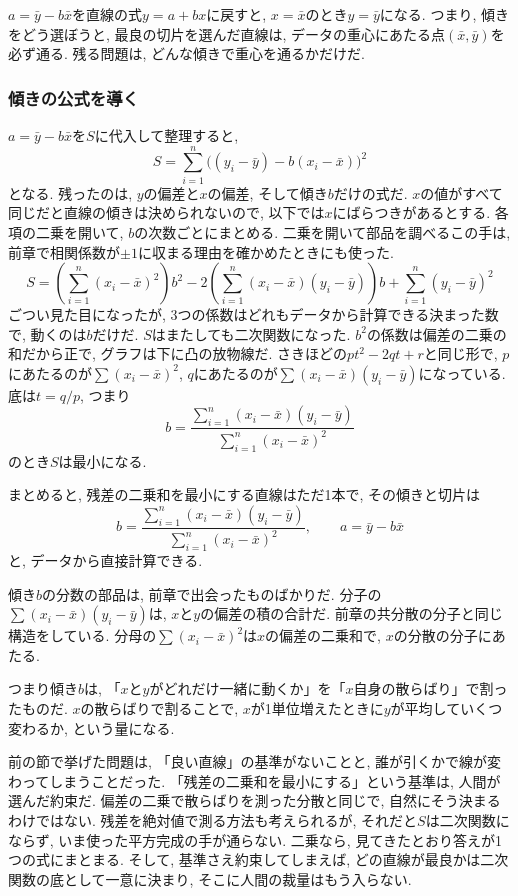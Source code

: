 $a = \bar{y} - b\bar{x}$を直線の式$y = a + bx$に戻すと, $x = \bar{x}$のとき$y = \bar{y}$になる.
つまり, 傾きをどう選ぼうと, 最良の切片を選んだ直線は, データの重心にあたる点$(\bar{x}, \bar{y})$を必ず通る.
残る問題は, どんな傾きで重心を通るかだけだ.

\subsubsection*{傾きの公式を導く}

$a = \bar{y} - b\bar{x}$を$S$に代入して整理すると,
\[
  S = \sum_{i=1}^{n} \bigl( (y_i - \bar{y}) - b(x_i - \bar{x}) \bigr)^2
\]
となる.
残ったのは, $y$の偏差と$x$の偏差, そして傾き$b$だけの式だ. $x$の値がすべて同じだと直線の傾きは決められないので, 以下では$x$にばらつきがあるとする.
各項の二乗を開いて, $b$の次数ごとにまとめる.
二乗を開いて部品を調べるこの手は, 前章で相関係数が$\pm 1$に収まる理由を確かめたときにも使った.
\[
  S = \left( \sum_{i=1}^{n}(x_i - \bar{x})^2 \right) b^2
      - 2\left( \sum_{i=1}^{n}(x_i - \bar{x})(y_i - \bar{y}) \right) b
      + \sum_{i=1}^{n}(y_i - \bar{y})^2
\]
ごつい見た目になったが, 3つの係数はどれもデータから計算できる決まった数で, 動くのは$b$だけだ.
$S$はまたしても二次関数になった.
$b^2$の係数は偏差の二乗の和だから正で, グラフは下に凸の放物線だ.
さきほどの$pt^2 - 2qt + r$と同じ形で, $p$にあたるのが$\sum(x_i - \bar{x})^2$, $q$にあたるのが$\sum(x_i - \bar{x})(y_i - \bar{y})$になっている.
底は$t = q/p$, つまり
\[
  b = \frac{\displaystyle\sum_{i=1}^{n}(x_i - \bar{x})(y_i - \bar{y})}{\displaystyle\sum_{i=1}^{n}(x_i - \bar{x})^2}
\]
のとき$S$は最小になる.

まとめると, 残差の二乗和を最小にする直線はただ1本で, その傾きと切片は
\[
  b = \frac{\displaystyle\sum_{i=1}^{n}(x_i - \bar{x})(y_i - \bar{y})}{\displaystyle\sum_{i=1}^{n}(x_i - \bar{x})^2}, \qquad a = \bar{y} - b\bar{x}
\]
と, データから直接計算できる.

傾き$b$の分数の部品は, 前章で出会ったものばかりだ.
分子の$\sum(x_i - \bar{x})(y_i - \bar{y})$は, $x$と$y$の偏差の積の合計だ.
前章の共分散の分子と同じ構造をしている.
分母の$\sum(x_i - \bar{x})^2$は$x$の偏差の二乗和で, $x$の分散の分子にあたる.

つまり傾き$b$は, 「$x$と$y$がどれだけ一緒に動くか」を「$x$自身の散らばり」で割ったものだ.
$x$の散らばりで割ることで, $x$が1単位増えたときに$y$が平均していくつ変わるか, という量になる.

前の節で挙げた問題は, 「良い直線」の基準がないことと, 誰が引くかで線が変わってしまうことだった.
「残差の二乗和を最小にする」という基準は, 人間が選んだ約束だ.
偏差の二乗で散らばりを測った分散と同じで, 自然にそう決まるわけではない.
残差を絶対値で測る方法も考えられるが, それだと$S$は二次関数にならず, いま使った平方完成の手が通らない.
二乗なら, 見てきたとおり答えが1つの式にまとまる.
そして, 基準さえ約束してしまえば, どの直線が最良かは二次関数の底として一意に決まり, そこに人間の裁量はもう入らない.

